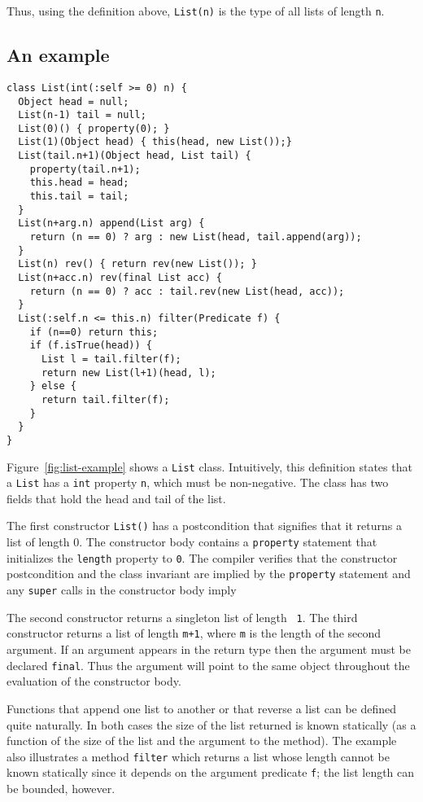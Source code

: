 Thus, using the definition above, {\tt List(n)} is the type of
all lists of length {\tt n}.


\subsection{An example}
\begin{figure*}
{\footnotesize
\begin{verbatim}
class List(int(:self >= 0) n) {
  Object head = null;
  List(n-1) tail = null;
  List(0)() { property(0); }
  List(1)(Object head) { this(head, new List());}
  List(tail.n+1)(Object head, List tail) {
    property(tail.n+1);
    this.head = head;
    this.tail = tail;
  }
  List(n+arg.n) append(List arg) {
    return (n == 0) ? arg : new List(head, tail.append(arg));
  }
  List(n) rev() { return rev(new List()); }
  List(n+acc.n) rev(final List acc) {
    return (n == 0) ? acc : tail.rev(new List(head, acc));
  }
  List(:self.n <= this.n) filter(Predicate f) {
    if (n==0) return this;
    if (f.isTrue(head)) {
      List l = tail.filter(f);
      return new List(l+1)(head, l);
    } else {
      return tail.filter(f);
    }
  }
}
\end{verbatim}}
\caption{List example}
\label{fig:list-example}
\end{figure*}

Figure~\ref{fig:list-example} shows a {\tt List} class.
Intuitively, this definition states that a {\tt List} has a {\tt int}
property {\tt n}, which must be non-negative.  The
class has two fields that hold the head and tail of the list.

The first constructor {\tt List()} has a postcondition that
signifies that it returns a list of length 0.
The constructor body contains a {\tt property} statement
that initializes the {\tt length} property to {\tt 0}.
The compiler verifies that
the constructor postcondition and the class invariant
are implied by the {\tt property} statement
and any {\tt super} calls in the constructor body imply

The 
second constructor returns a singleton list of length {\tt
1}. The third constructor returns a list of length {\tt m+1}, where
{\tt m} is the length of the second argument. 
If an argument appears in the return type then the argument must be
declared {\tt final}. Thus the argument will point to the same object
throughout the evaluation of the constructor body.

Functions that append one list to another or that reverse a list can
be defined quite naturally. In both cases the size of the list
returned is known statically (as a function of the size of the list
and the argument to the method).  The example also illustrates a
method {\tt filter} which returns a list whose length cannot be known
statically since it depends on the argument predicate {\tt f};
the list length can be bounded, however.

